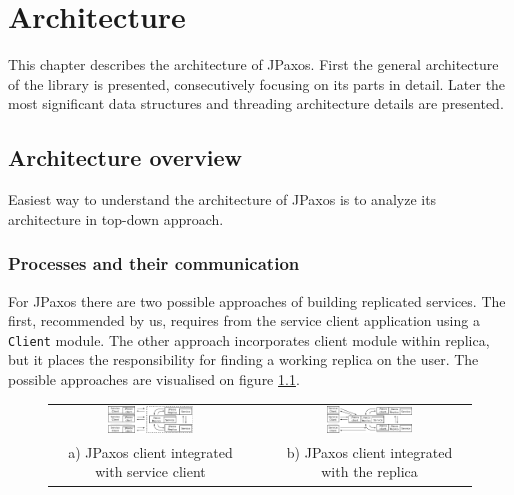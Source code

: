 \chapter{Architecture}

This chapter describes the architecture of JPaxos.
First the general architecture of the library is presented, consecutively focusing on its parts in detail.
Later the most significant data structures and threading architecture details are presented.

\section{Architecture overview}
\indent\par
Easiest way to understand the architecture of JPaxos is to analyze its architecture in top-down approach.

\subsection{Processes and their communication}

For JPaxos there are two possible approaches of building replicated services. The first, recommended by us, requires from the service client application using a \texttt{Client} module. The other approach incorporates client module within replica, but it places the responsibility for finding a working replica on the user. The possible approaches are visualised on figure \ref{fig:jpaxos_processes}.

\begin{figure}[h]
 \begin{tabular}{ccc}
  \includegraphics[width=0.44\textwidth]{architecture/userArchitecture1.pdf}
  &
  \hspace{0.02\textwidth}
  &
  \includegraphics[width=0.44\textwidth]{architecture/userArchitecture2.pdf}
  \\ 
  \scriptsize a) JPaxos client integrated with service client
  & & 
  \scriptsize b) JPaxos client integrated with the replica\\
 \end{tabular}
 \label{fig:jpaxos_processes}
\end{figure}

